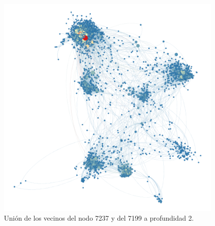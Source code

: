 \begin{figure}[H]
    \centerfloat
    \includegraphics[width=1.3\textwidth]{img/resultados/grado-vector7199y7237.png}
    \caption{Unión de los vecinos del nodo 7237 y del 7199 a profundidad 2.}
\end{figure}